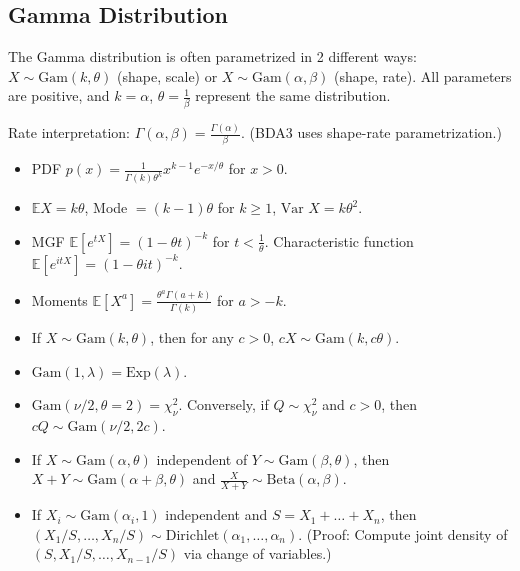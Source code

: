 \documentclass[twoside]{article}
\newcommand{\dis}{\displaystyle}
\newcommand\bbE{\mathbb{E}}
\newcommand\lmb{\lambda}
\def\t{\theta}
\newcommand\var{\text{Var }}
\begin{document}
\subsection{Gamma Distribution}
The Gamma distribution is often parametrized in 2 different ways: $X \sim \text{Gam}(k, \t)$ (shape, scale) or $X \sim \text{Gam}(\alpha, \beta)$ (shape, rate). All parameters are positive, and $k = \alpha$, $\t = \frac{1}{\beta}$ represent the same distribution.

Rate interpretation: $\Gamma(\alpha, \beta) = \dis\frac{\Gamma(\alpha)}{\beta}$. (BDA3 uses shape-rate parametrization.)

\begin{itemize}
\item PDF $p(x) = \displaystyle\frac{1}{\Gamma (k) \t^k} x^{k-1} e^{-x/\t}$ for $x > 0$.

\item $\bbE X = k\t$, Mode $= (k-1)\t$ for $k \geq 1$, $\var X = k \t^2$.

\item MGF $\bbE [e^{tX}] = (1 - \t t)^{-k}$ for $t < \displaystyle\frac{1}{\t}$. Characteristic function $\bbE [e^{itX}] = (1 - \t i t)^{-k}$.

\item Moments $\bbE [X^a] = \displaystyle\frac{\t^a \Gamma(a + k)}{\Gamma(k)}$ for $a > -k$.

\item If $X \sim \text{Gam}(k, \t)$, then for any $c > 0$, $cX \sim \text{Gam}(k, c\t)$.

\item $\text{Gam}(1,\lmb) = \text{Exp}(\lmb)$.

\item $\text{Gam}(\nu/2, \t = 2) = \chi_\nu^2$. Conversely, if $Q \sim \chi_\nu^2$ and $c > 0$, then $cQ \sim \text{Gam}(\nu/2, 2c)$.

\item If $X \sim \text{Gam}(\alpha, \t)$ independent of $Y \sim \text{Gam}(\beta, \t)$, then $X + Y \sim \text{Gam}(\alpha + \beta, \t)$ and $\displaystyle\frac{X}{X+Y} \sim \text{Beta}(\alpha, \beta)$.

\item If $X_i \sim \text{Gam}(\alpha_i, 1)$ independent and $S = X_1 + \dots + X_n$, then $(X_1/S, \dots, X_n/S) \sim \text{Dirichlet}(\alpha_1, \dots, \alpha_n)$. (Proof: Compute joint density of $(S, X_1/S, \dots, X_{n-1}/S)$ via change of variables.)

\end{itemize}
\end{document}
